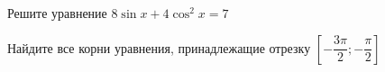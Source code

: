 \begin{ex}
	\begin{condition}
		\begin{enumcols}[label=\asbuk*)]
			\item Решите уравнение \( 8\sin x + 4\cos^2 x = 7 \)
			\item Найдите все корни уравнения, принадлежащие отрезку \( \left[-\dfrac{3\pi}{2};-\dfrac{\pi}{2}\right] \)
		\end{enumcols}
	\end{condition}
\end{ex}